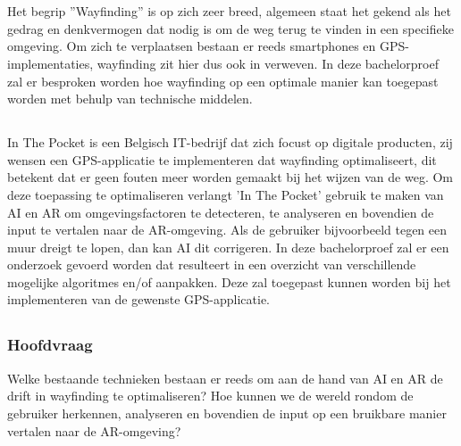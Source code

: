 \chapter{}
\label{ch:inleiding}

\section{}
\label{sec:wayfinding}
Het begrip ''Wayfinding'' is op zich zeer breed, algemeen staat het gekend als het gedrag en denkvermogen dat nodig is om de weg terug te vinden in een specifieke omgeving. Om zich te verplaatsen bestaan er reeds smartphones en GPS-implementaties, wayfinding zit hier dus ook in verweven. In deze bachelorproef zal er besproken worden hoe wayfinding op een optimale manier kan toegepast worden met behulp van technische middelen.

\section{}
\label{sec:probleemstelling}

In The Pocket is een Belgisch IT-bedrijf dat zich focust op digitale producten, zij wensen een GPS-applicatie te implementeren dat wayfinding optimaliseert, dit betekent dat er geen fouten meer worden gemaakt bij het wijzen van de weg. Om deze toepassing te optimaliseren verlangt 'In The Pocket' gebruik te maken van AI en AR om omgevingsfactoren te detecteren, te analyseren en bovendien de input te vertalen naar de AR-omgeving. Als de gebruiker bijvoorbeeld tegen een muur dreigt te lopen, dan kan AI dit corrigeren. In deze bachelorproef zal er een onderzoek gevoerd worden dat resulteert in een overzicht van verschillende mogelijke algoritmes en/of aanpakken. Deze zal toegepast kunnen worden bij het implementeren van de gewenste GPS-applicatie.

\section{}
\label{sec:onderzoeksvraag}

\subsection{Hoofdvraag}
Welke bestaande technieken bestaan er reeds om aan de hand van AI en AR de drift in wayfinding te optimaliseren? Hoe kunnen we de wereld rondom de gebruiker herkennen, analyseren en bovendien de input op een bruikbare manier vertalen naar de AR-omgeving?

